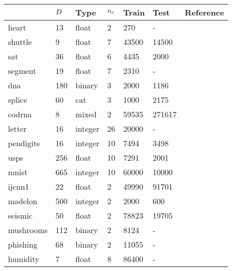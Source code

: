 \begin{tabular}{|l|llllll|}
	\hline
	& $D$ & Type & $n_c$ & Train & Test & Reference \\\hline
	heart & 13 & float & 2 & 270 & - & {\small \citep{Lichman2013}}\\
	shuttle & 9 & float & 7 & 43500 & 14500 & {\small \citep{King_etal1995}}\\
	sat & 36 & float & 6 & 4435 & 2000 & {\small \citep{King_etal1995}}\\
	segment & 19 & float & 7 & 2310 & - & {\small \citep{King_etal1995}} \\
	dna & 180 & binary & 3 & 2000 & 1186 & {\small \citep{Michie_etal1994}}\\
	splice &  60 & cat & 3 & 1000 & 2175 & {\small \citep{Michie_etal1994}}\\
	codrna &  8 & mixed & 2 & 59535 & 271617 & {\small \citep{Uzilov_etal2006}}\\
	letter &  16 & integer & 26 & 20000 & - & {\small \citep{Frey_Slate1991}}\\
	pendigits & 16 & integer & 10 & 7494 & 3498 & {\small \citep{Alimoglu1996}}\\
	usps & 256 & float & 10 & 7291 & 2001 & {\small \citep{Hull1994}}\\
	mnist & 665 & integer & 10 & 60000 & 10000 & {\small \citep{LeCun_etal1998}}\\
	ijcnn1 & 22 & float & 2 & 49990 & 91701 & {\small \citep{Feldkamp_Puskorius1998}}\\
	madelon & 500 & integer & 2 & 2000 & 600 & {\small \citep{Guyon_etal2004}}\\
	seismic & 50 & float & 2 & 78823 & 19705 & {\small \citep{Duarte_Hu2004}}\\
	mushrooms & 112 & binary & 2 & 8124 & - & {\small \citep{Iba_etal1988}}\\
	phishing & 68 & binary & 2 & 11055 & - & {\small \citep{Mohommad_etal2014}}\\
	humidity & 7 & float & 8 & 86400 & - & {\small \citep{Mills2009}}\\
	\hline
\end{tabular}

